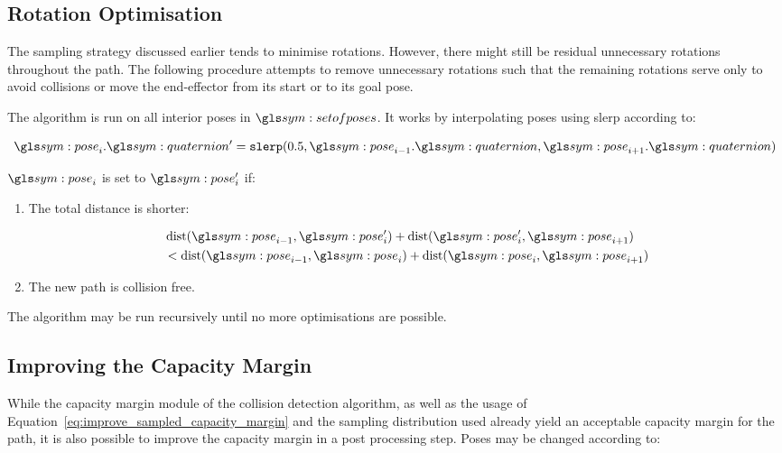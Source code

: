 	\subsection{Rotation Optimisation}

		The sampling strategy discussed earlier tends
		to minimise rotations. However, there might still be residual
		unnecessary rotations throughout the path. The following procedure
		attempts to remove unnecessary rotations such that the remaining
		rotations serve only to avoid collisions or move the end-effector from
		its start or to its goal pose.

		The algorithm is run on all interior poses in $\setofposes$. It works by
		interpolating poses using \gls{slerp} according to:

		\begin{equation}
			\pose_i.\quaternion' = \code{slerp}(0.5, \pose_{i - 1}.\quaternion,
			\pose_{i + 1}.\quaternion)
		\end{equation}

		$\pose_i$ is set to $\pose_i'$ if:

		\begin{enumerate}

			\item

				The total distance is shorter:

				\begin{equation}
					\begin{split}
						&\dist(\pose_{i - 1}, \pose_i')
							+ \dist(\pose_i', \pose_{i+1})\\
						&<
						\dist(\pose_{i - 1}, \pose_i)
							+ \dist(\pose_i, \pose_{i + 1})
					\end{split}
				\end{equation}

			\item

				The new path is collision free.

		\end{enumerate}

		The algorithm may be run recursively until no more optimisations are
		possible.

	\subsection{Improving the Capacity Margin}

		While the capacity margin module of the collision detection algorithm,
		as well as the usage of
		Equation~\ref{eq:improve_sampled_capacity_margin} and the sampling
		distribution used already yield an acceptable capacity margin for the
		path, it is also possible to improve the capacity margin in a post
		processing step. Poses may be changed according to:

